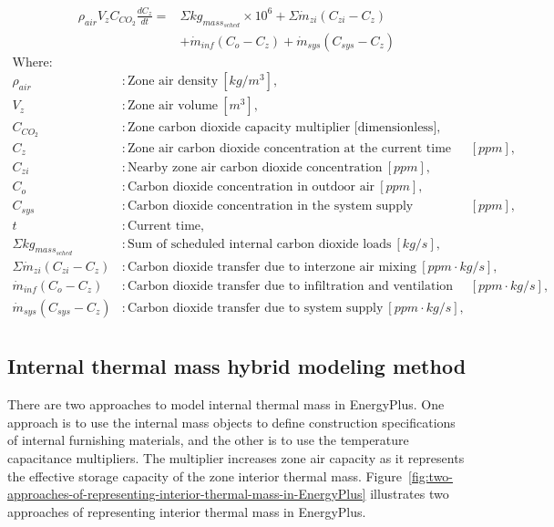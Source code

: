 \begin{equation}
\begin{aligned}
\rho_{air} V_{z} C_{CO_{2}}\frac {dC_z} {dt} = &\Sigma{kg_{mass_{sched}}}\times 10^{6} + \Sigma{\dot{m}_{zi}(C_{zi}-C_z)} \\
& + \dot{m}_{inf} (C_o - C_z) + \dot{m}_{sys} (C_{sys} - C_z)
\end{aligned}
\end{equation}
\begin{align*}
\text{Where: }\\
  \rho_{air} &: \text{Zone air density} ~ [kg/m^{3}], \\
  V_{z} &: \text{Zone air volume} ~ [m^{3}],\\
  C_{CO_{2}} &: \text{Zone carbon dioxide capacity multiplier [dimensionless]},\\
  C_{z} &: \text{Zone air carbon dioxide concentration at the current time step} ~ [ppm],\\
  C_{zi} &: \text{Nearby zone air carbon dioxide concentration} ~ [ppm],\\
  C_o&: \text{Carbon dioxide concentration in outdoor air} ~ [ppm],\\
  C_{sys}&: \text{Carbon dioxide concentration in the system supply airstream}~ [ppm],\\
  t &: \text{Current time},\\
  \Sigma{kg_{mass_{sched}}} &: \text{Sum of scheduled internal carbon dioxide loads} ~ [kg/s],\\
  \Sigma{\dot{m}_{zi}(C_{zi}-C_z)} &: \text{Carbon dioxide transfer due to interzone air mixing} ~ [ppm \cdot kg/s],\\
  \dot{m}_{inf} (C_o - C_z)&: \text{Carbon dioxide transfer due to infiltration and ventilation of outdoor air} ~ [ppm \cdot kg/
s],\\
  \dot{m}_{sys} (C_{sys} - C_z)&: \text{Carbon dioxide transfer due to system supply} ~ [ppm \cdot kg/s],\\
\end{align*}


\subsection{Internal thermal mass hybrid modeling method}\label{internal-thermal-mass-hybrid-modeling method}
There are two approaches to model internal thermal mass in EnergyPlus. One approach is to use the internal mass objects to define construction specifications of internal furnishing materials, and the other is to use the temperature capacitance multipliers. The multiplier increases zone air capacity as it represents the effective storage capacity of the zone interior thermal mass. Figure~\ref {fig:two-approaches-of-representing-interior-thermal-mass-in-EnergyPlus} illustrates two approaches of representing interior thermal mass in EnergyPlus.

